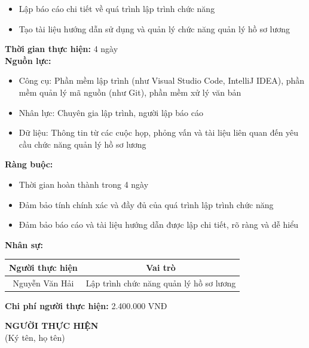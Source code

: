 {\begin{minipage}{\textwidth}
\begin{itemize}
        \item Lập báo cáo chi tiết về quá trình lập trình chức năng
        \item Tạo tài liệu hướng dẫn sử dụng và quản lý chức năng quản lý hồ sơ lương
    \end{itemize}
    \vspace{0.5cm}
    \noindent \textbf{Thời gian thực hiện:} 4 ngày \\
    \noindent \textbf{Nguồn lực:}
    \begin{itemize}
        \item Công cụ: Phần mềm lập trình (như Visual Studio Code, IntelliJ IDEA), phần mềm quản lý mã nguồn (như Git), phần mềm xử lý văn bản
        \item Nhân lực: Chuyên gia lập trình, người lập báo cáo
        \item Dữ liệu: Thông tin từ các cuộc họp, phỏng vấn và tài liệu liên quan đến yêu cầu chức năng quản lý hồ sơ lương
    \end{itemize}
    \vspace{0.5cm}
    \noindent \textbf{Ràng buộc:}
    \begin{itemize}
        \item Thời gian hoàn thành trong 4 ngày
        \item Đảm bảo tính chính xác và đầy đủ của quá trình lập trình chức năng
        \item Đảm bảo báo cáo và tài liệu hướng dẫn được lập chi tiết, rõ ràng và dễ hiểu
    \end{itemize}
    \vspace{0.5cm}
    \noindent \textbf{Nhân sự:}
    \begin{longtable}{|c|c|}
    \hline
    \textbf{Người thực hiện} & \textbf{Vai trò} \\
    \hline
    Nguyễn Văn Hải & Lập trình chức năng quản lý hồ sơ lương \\
    \hline
    \end{longtable}
    \vspace{0.5cm}
    \noindent \textbf{Chi phí người thực hiện:} 2.400.000 VNĐ \\
    \vspace{1cm}
    \begin{flushleft}
        \hspace{8cm} \textbf{NGƯỜI THỰC HIỆN} \\
        \hspace{8.8cm} (Ký tên, họ tên) \\
        \vspace{1cm}
    \end{flushleft}
    \end{minipage}
}
% 
